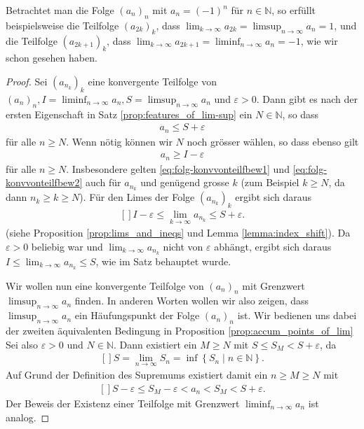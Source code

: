 \documentclass[../Analysis1_script.tex]{subfiles}
\begin{document}
\begin{example}
	Betrachtet man die Folge $(a_n)_n$ mit $a_n = (-1)^n$ für $n \in \mathbb {N}$, so erfüllt beispielsweise die Teilfolge $(a_{2k})_k$, dass $\lim _{k \to \infty }a_{2k} = \limsup _{n \to \infty } a_n = 1$, und die Teilfolge $(a_{2k+1})_k$, dass $\lim _{k \to \infty }a_{2k+1} = \liminf _{n \to \infty } a_n = -1$, wie wir schon gesehen haben.
\end{example}

\begin{proof}
	 Sei $(a_{n_k})_k$ eine konvergente Teilfolge von $(a_n)_n, I = \liminf _{n \to \infty }a_n, S = \limsup _{n \to \infty }a_n$ und $\varepsilon >0$. Dann gibt es nach der ersten Eigenschaft in Satz \ref{prop:features_of_lim-sup} ein $N \in \mathbb {N}$, so dass
	\begin{align}\label{eq:folg-konvvonteilfbew1} 
		a_n \leq S + \varepsilon
	\end{align}
	für alle $n \geq N$. Wenn nötig können wir $N$ noch grösser wählen, so dass ebenso gilt
	\begin{align}\label{eq:folg-konvvonteilfbew2} 
		a_n \geq I- \varepsilon
	\end{align}
	für alle $n \geq N$. Insbesondere gelten \ref{eq:folg-konvvonteilfbew1} und \ref{eq:folg-konvvonteilfbew2} auch für $a_{n_k}$ und genügend grosse $k$ (zum Beispiel $k \geq N$, da dann $n_k \geq k \geq N$). Für den Limes der Folge $(a_{n_k})_k$ ergibt sich daraus
	\[\begin{aligned}[]
		I - \varepsilon \leq \lim _{k \to \infty } a_{n_k} \leq S + \varepsilon .
	\end{aligned}\]
	(siehe Proposition \ref{prop:lims_and_ineqs} und Lemma \ref{lemma:index_shift}). Da $\varepsilon >0$ beliebig war und $\lim _{k \to \infty } a_{n_k}$ nicht von $\varepsilon$ abhängt, ergibt sich daraus $I \leq \lim _{k \to \infty } a_{n_k} \leq S$, wie im Satz behauptet wurde.
	
	Wir wollen nun eine konvergente Teilfolge von $(a_n)_n$ mit Grenzwert $\limsup _{n\to \infty }a_n$ finden. In anderen Worten wollen wir also zeigen, dass $\limsup _{n\to \infty }a_n$ ein Häufungspunkt der Folge $(a_n)_n$ ist. Wir bedienen uns dabei der zweiten äquivalenten Bedingung in Proposition \ref{prop:accum_points_of_lim} Sei also $\varepsilon >0$ und $N\in \mathbb {N}$. Dann existiert ein $M\geq N$ mit $S\leq S_M< S+\varepsilon$, da
	\[\begin{aligned}[]
		S=\lim _{n\to \infty }S_n=\inf \left \lbrace {S_n} \mid {n\in \mathbb {N}}\right \rbrace .
	\end{aligned}\]
	Auf Grund der Definition des Supremums existiert damit ein $n\geq M\geq N$ mit
	\[\begin{aligned}[]
		S-\varepsilon \leq S_M-\varepsilon <a_n<S_M<S+\varepsilon .
	\end{aligned}\]
	Der Beweis der Existenz einer Teilfolge mit Grenzwert $\liminf _{n \to \infty }a_n$ ist analog. 
\end{proof}
\end{document}
